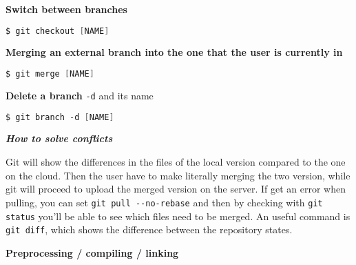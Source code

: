 \documentclass[fontsize=8pt, a4paper, landscape, fleqn]{scrartcl}
\renewcommand{\section}[1]{%
    \noindent\colorbox{sectioncolor}{%
        \parbox{\dimexpr\columnwidth-2\fboxsep}{\color{white}\textbf{#1}}}%
    \vspace{0.5mm}%
}
\renewcommand{\subsubsection}[1]{%
    \noindent\textbf{\textit{\color{subsectioncolor}#1}}%
    \vspace{1mm}%
}
\begin{document}
\begin{multicols*}{3}[\raggedcolumns]
    \textbf{Switch between branches}
    \begin{lstlisting}[language=C, breaklines]
    $ git checkout [NAME] \end{lstlisting}

    \textbf{Merging an external branch into the one that the user is currently in} 
    \begin{lstlisting}[language=C, breaklines]
    $ git merge [NAME] \end{lstlisting}
    
    \textbf{Delete a branch} 
    \lstinline{-d} and its name
    \begin{lstlisting}[language=C, breaklines]
    $ git branch -d [NAME] \end{lstlisting}
    
    \subsubsection{How to solve conflicts}
    Git will show the differences in the files of the local version compared to the one on the cloud. Then the user have to make literally merging the two version, while git will proceed to upload the merged version on the server. If get an error when pulling, you can set \lstinline{git pull --no-rebase} and then by checking with \lstinline{git status} you'll be able to see which files need to be merged. An useful command is \lstinline{git diff}, which shows the difference between the repository states.
    
	\section{Preprocessing / compiling / linking}

\end{multicols*}
\end{document}
